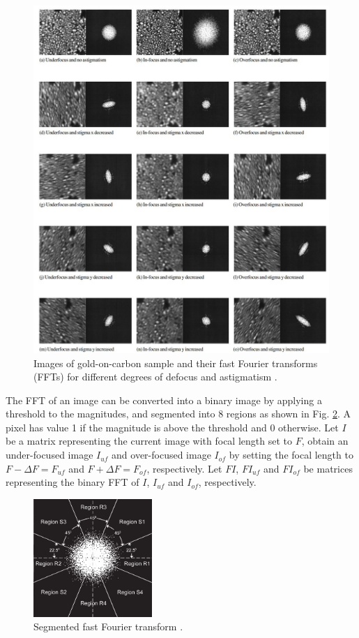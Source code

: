 \documentclass[conference]{IEEEtran}
\begin{document}
\begin{figure}[htbp]
    \centering
    \includegraphics[width=1\textwidth]{Images/SEM astigmatism.jpg}
    \caption{Images of gold-on-carbon sample and their fast Fourier transforms (FFTs) for different degrees of defocus and astigmatism \cite{SEM astigmatation correction algorithm}.}
    \label{SEM astigmatism}
\end{figure}

The FFT of an image can be converted into a binary image by applying a threshold to the magnitudes, and segmented into 8 regions as shown in Fig. \ref{FFT regions}. A pixel has value 1 if the magnitude is above the threshold and 0 otherwise. Let $I$ be a matrix representing the current image with focal length set to $F$, obtain an under-focused image $I_{uf}$ and over-focused image $I_{of}$ by setting the focal length to $F-\Delta F=F_{uf}$ and $F+\Delta F=F_{of}$, respectively. Let $FI$, $FI_{uf}$ and $FI_{of}$ be matrices representing the binary FFT of $I$, $I_{uf}$ and $I_{of}$, respectively.

\begin{figure}[htbp]
    \centering
    \includegraphics[width=0.4\textwidth]{Images/FFT regions.jpg}
    \caption{Segmented fast Fourier transform \cite{SEM astigmatation correction algorithm}.}
    \label{FFT regions}
\end{figure}
\end{document}
